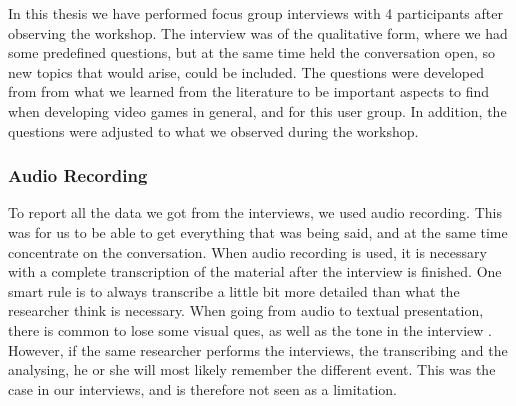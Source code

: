 In this thesis we have performed focus group interviews with 4 participants after observing the workshop. The interview was of the qualitative form, where we had some predefined questions, but at the same time held the conversation open, so new topics that would arise, could be included. The questions were developed from from what we learned from the literature to be important aspects to find when developing video games in general, and for this user group. In addition, the questions were adjusted to what we observed during the workshop. 

\subsubsection{Audio Recording}
To report all the data we got from the interviews, we used audio recording. This was for us to be able to get everything that was being said, and at the same time concentrate on the conversation. When audio recording is used, it is necessary with a complete transcription of the material after the interview is finished. One smart rule is to always transcribe a little bit more detailed than what the researcher think is necessary. When going from audio to textual presentation, there is common to lose some visual ques, as well as the tone in the interview \cite{tjora}. However, if the same researcher performs the interviews, the transcribing and the analysing, he or she will most likely remember the different event. This was the case in our interviews, and is therefore not seen as a limitation. 

